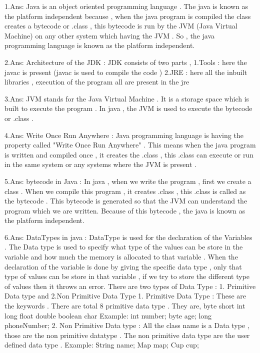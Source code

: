 1.Ans: Java is an object oriented programming language . The java is known as the platform independent because , when the java program is compiled the class creates a bytecode or .class , this bytecode is run by the JVM (Java Virtual Machine) on any other system which having the JVM . So , the java programming language is known as the platform independent.

2.Ans: Architecture of the JDK :
	JDK consists of two parts , 1.Tools : here the javac is present (javac is used to compile the code )
				    2.JRE : here all the inbuilt libraries , execution of the program all are present in the jre  

3.Ans: JVM stands for the Java Virtual Machine . It is a storage space which is built to execute the program . 	In java , the JVM is used to execute the bytecode or .class .

4.Ans: Write Once Run Anywhere : Java programming language is having the property called "Write Once Run Anywhere" . This means when the java program is written and compiled once , it creates the .class , this  .class can execute or run in the same system or any systems where the JVM is present .

5.Ans: bytecode in Java :  In java , when we write the program , first we create a class . When we compile this program , it creates .class , this .class is called as the bytecode . This bytecode is generated so that the JVM can understand the program which we are written. Because of this bytecode , the java is known as the platform independent. 

6.Ans: DataTypes in java : DataType is used for the declaration of the Variables . The Data type is used to specify what type of the values can be store in the variable and how much the memory is allocated to that variable . When the declaration of the variable is done by giving the specific data type , only that type of values can be store in that variable , if we try to store the different type of values then it throws an error. 
	There are two types of Data Type : 1. Primitive Data type and 2.Non Primitive Data Type 
	1. Primitive Data Type : These are the keywords . There are total 8 primitive data type . They are,
		byte
		short
		int
		long
		float
		double
		boolean  
		char
	Example: int number; 
  		 byte age;
		 long phoneNumber;
	2. Non Primitive Data type : All the class name is a Data type  , those are the non primitive datatype . The non primitive data type are the user defined data type .
	Example: String name;
		 Map map;
		 Cup cup;


